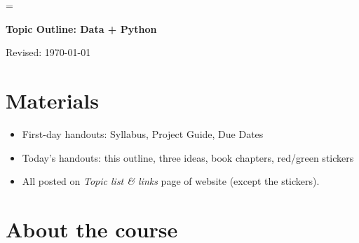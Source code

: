 \documentclass[11pt]{article}
\begin{document}
\parskip=\bigskipamount
\parindent=0.0in
\thispagestyle{empty}


\bigskip\bigskip
\centerline{\Large \bf Topic Outline:  Data + Python}
\centerline{Revised: \today}


\section*{Materials}

\begin{itemize}
\item  First-day handouts:  Syllabus, Project Guide, Due Dates
\item  Today's handouts:  this outline, three ideas, book chapters, red/green stickers
\item  All posted on {\it Topic list \& links\/} page of website (except the stickers).
\end{itemize}



\section*{About the course}
\end{document}
